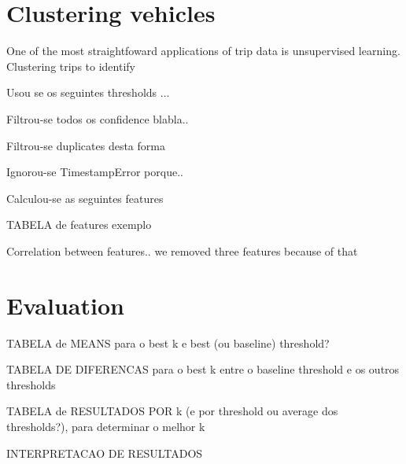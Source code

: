 \section{Clustering vehicles}\label{s.classification}

One of the most straightfoward applications of trip data is unsupervised learning. Clustering trips to identify

Usou se os seguintes thresholds ...

Filtrou-se todos os confidence blabla..

Filtrou-se duplicates desta forma

Ignorou-se TimestampError porque..

Calculou-se as seguintes features

TABELA de features exemplo

Correlation between features.. we removed three features because of that

\section{Evaluation}\label{s.results}

TABELA de MEANS para o best k e best (ou baseline) threshold?

TABELA DE DIFERENCAS para o best k entre o baseline threshold e os outros thresholds

TABELA de RESULTADOS POR k (e por threshold ou average dos thresholds?), para determinar o melhor k

INTERPRETACAO DE RESULTADOS
